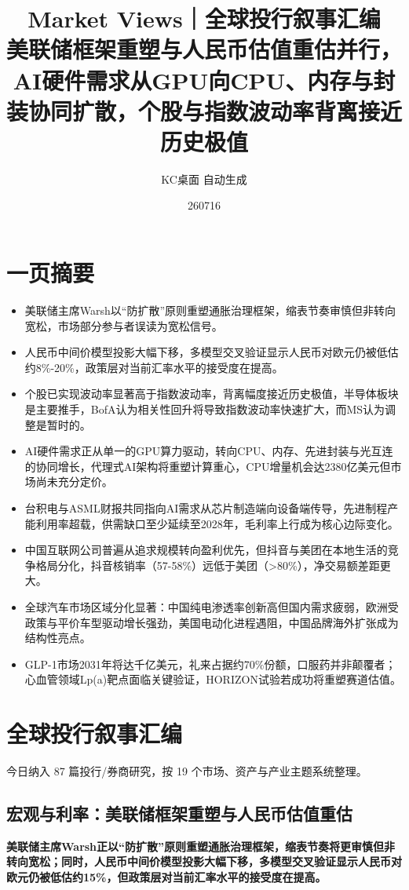 \documentclass[11pt]{ctexart}
\title{\textbf{Market Views｜全球投行叙事汇编}\\[0.4em]{\large 美联储框架重塑与人民币估值重估并行，AI硬件需求从GPU向CPU、内存与封装协同扩散，个股与指数波动率背离接近历史极值}}
\author{KC桌面 自动生成}
\date{260716}
\begin{document}
\maketitle
\tableofcontents
\newpage
\section{一页摘要}
\begin{itemize}
  \item 美联储主席Warsh以“防扩散”原则重塑通胀治理框架，缩表节奏审慎但非转向宽松，市场部分参与者误读为宽松信号。
  \item 人民币中间价模型投影大幅下移，多模型交叉验证显示人民币对欧元仍被低估约8\%-20\%，政策层对当前汇率水平的接受度在提高。
  \item 个股已实现波动率显著高于指数波动率，背离幅度接近历史极值，半导体板块是主要推手，BofA认为相关性回升将导致指数波动率快速扩大，而MS认为调整是暂时的。
  \item AI硬件需求正从单一的GPU算力驱动，转向CPU、内存、先进封装与光互连的协同增长，代理式AI架构将重塑计算重心，CPU增量机会达2380亿美元但市场尚未充分定价。
  \item 台积电与ASML财报共同指向AI需求从芯片制造端向设备端传导，先进制程产能利用率超载，供需缺口至少延续至2028年，毛利率上行成为核心边际变化。
  \item 中国互联网公司普遍从追求规模转向盈利优先，但抖音与美团在本地生活的竞争格局分化，抖音核销率（57-58\%）远低于美团（>80\%），净交易额差距更大。
  \item 全球汽车市场区域分化显著：中国纯电渗透率创新高但国内需求疲弱，欧洲受政策与平价车型驱动增长强劲，美国电动化进程遇阻，中国品牌海外扩张成为结构性亮点。
  \item GLP-1市场2031年将达千亿美元，礼来占据约70\%份额，口服药并非颠覆者；心血管领域Lp(a)靶点面临关键验证，HORIZON试验若成功将重塑赛道估值。
\end{itemize}
\section{全球投行叙事汇编}
今日纳入 87 篇投行/券商研究，按 19 个市场、资产与产业主题系统整理。
\newpage
\subsection{宏观与利率：美联储框架重塑与人民币估值重估}
\textbf{美联储主席Warsh正以“防扩散”原则重塑通胀治理框架，缩表节奏将更审慎但非转向宽松；同时，人民币中间价模型投影大幅下移，多模型交叉验证显示人民币对欧元仍被低估约15\%，但政策层对当前汇率水平的接受度在提高。}
\end{document}
